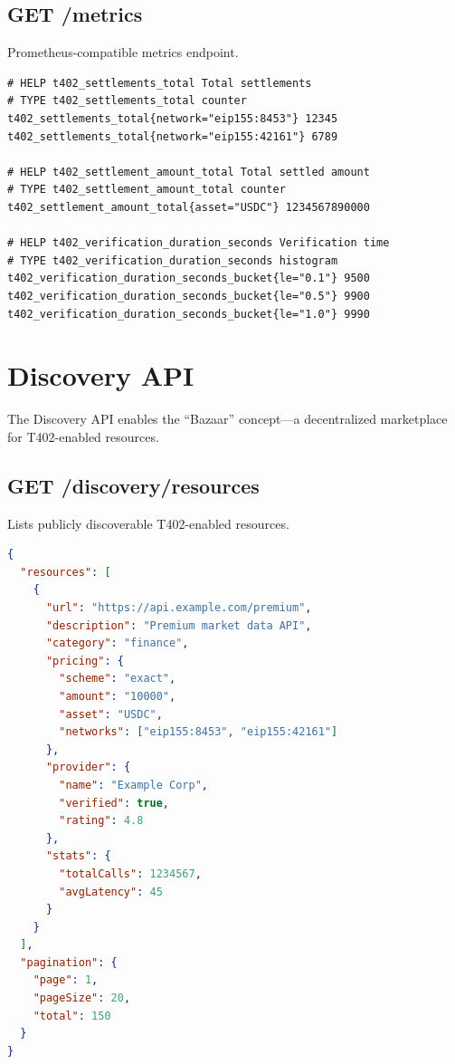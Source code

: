 \subsection{GET /metrics}
\label{subsec:metrics-endpoint}

Prometheus-compatible metrics endpoint.

\begin{lstlisting}[caption={/metrics response (Prometheus format)}]
# HELP t402_settlements_total Total settlements
# TYPE t402_settlements_total counter
t402_settlements_total{network="eip155:8453"} 12345
t402_settlements_total{network="eip155:42161"} 6789

# HELP t402_settlement_amount_total Total settled amount
# TYPE t402_settlement_amount_total counter
t402_settlement_amount_total{asset="USDC"} 1234567890000

# HELP t402_verification_duration_seconds Verification time
# TYPE t402_verification_duration_seconds histogram
t402_verification_duration_seconds_bucket{le="0.1"} 9500
t402_verification_duration_seconds_bucket{le="0.5"} 9900
t402_verification_duration_seconds_bucket{le="1.0"} 9990
\end{lstlisting}

\section{Discovery API}
\label{sec:discovery-api}

The Discovery API enables the ``Bazaar'' concept---a decentralized marketplace for T402-enabled resources.

\subsection{GET /discovery/resources}
\label{subsec:discovery-resources}

Lists publicly discoverable T402-enabled resources.

\begin{lstlisting}[language=json,caption={/discovery/resources response}]
{
  "resources": [
    {
      "url": "https://api.example.com/premium",
      "description": "Premium market data API",
      "category": "finance",
      "pricing": {
        "scheme": "exact",
        "amount": "10000",
        "asset": "USDC",
        "networks": ["eip155:8453", "eip155:42161"]
      },
      "provider": {
        "name": "Example Corp",
        "verified": true,
        "rating": 4.8
      },
      "stats": {
        "totalCalls": 1234567,
        "avgLatency": 45
      }
    }
  ],
  "pagination": {
    "page": 1,
    "pageSize": 20,
    "total": 150
  }
}
\end{lstlisting}


